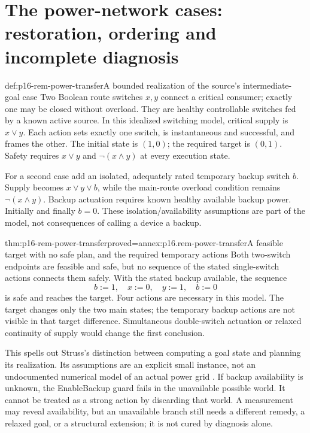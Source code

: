 \section{The power-network cases: restoration, ordering and incomplete diagnosis}
\label{sec:p16-rem-power}

\begin{hbdefinition}{def:p16-rem-power-transfer}{A bounded realization of the source's intermediate-goal case}
Two Boolean route switches \(x,y\) connect a critical consumer; exactly
one may be closed without overload. They are healthy controllable switches
fed by a known active source. In this idealized switching model,
critical supply is \(x\lor y\). Each action sets exactly one switch,
is instantaneous and successful, and frames the other. The initial state
is \((1,0)\); the required target is \((0,1)\). Safety requires
\(x\lor y\) and \(\neg(x\land y)\) at every execution state.

For a second case add an isolated, adequately rated temporary backup switch
\(b\). Supply becomes \(x\lor y\lor b\), while the main-route
overload condition remains \(\neg(x\land y)\). Backup actuation requires
known healthy available backup power. Initially and finally \(b=0\).
These isolation/availability assumptions are part of the model, not consequences
of calling a device a backup.
\end{hbdefinition}

\begin{hbtheorem}{thm:p16-rem-power-transfer}{proved=annex:p16.rem-power-transfer}{A feasible target with no safe plan, and the required temporary actions}
Both two-switch endpoints are feasible and safe, but no
sequence of the stated single-switch actions connects them safely.
With the stated backup available, the sequence
\[
 b:=1,\quad x:=0,\quad y:=1,\quad b:=0
\]
is safe and reaches the target. Four actions are necessary in this model.
The target changes only the two main states; the temporary backup actions
are not visible in that target difference. Simultaneous double-switch
actuation or relaxed continuity of supply would change the first conclusion.
\end{hbtheorem}

This spells out Struss's distinction between computing a goal state and
planning its realization. Its assumptions are an explicit small instance,
not an undocumented numerical model of an actual power grid
\cite[p.~453]{Struss2008ModelBasedProblemSolving}.
If backup availability is unknown, the EnableBackup guard fails in the
unavailable possible world. It cannot be treated as a strong action by
discarding that world. A measurement may reveal availability, but an
unavailable branch still needs a different remedy, a relaxed goal, or a
structural extension; it is not cured by diagnosis alone.

